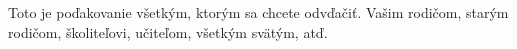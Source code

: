 %
%

Toto je poďakovanie všetkým, ktorým sa chcete odvďačiť.
Vašim rodičom, starým rodičom, školiteľovi, učiteľom, všetkým svätým, atď.